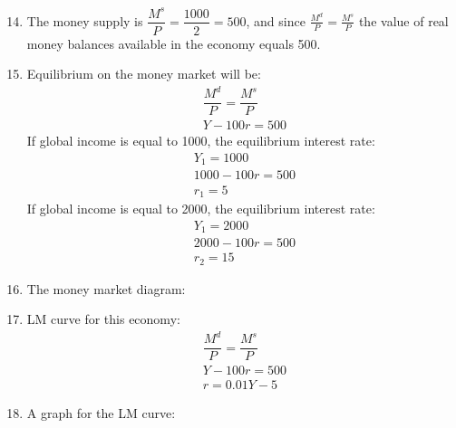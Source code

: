 \documentclass[a4paper,12pt]{article} %
\begin{document}
\begin{enumerate}
\begin{enumerate} [label=\arabic*)] 
	\setcounter{enumii}{13}


\item  The money supply is  $ \dfrac{M^{s}}{P} =  \dfrac{1000}{2} = 500 $, and since $ \frac{M^{d}}{P} = \frac{M^{s}}{P}  $ the value of real money balances available in the economy equals 500.

\item  Equilibrium on the money
market will be:
\begin{gather}
\dfrac{M^{d}}{P} = \dfrac{M^{s}}{P} \\  
Y - 100r = 500 
\end{gather}
If global income is equal to 1000, the equilibrium interest rate: 
\begin{gather}
Y_{1}=1000 \\  
1000 - 100r = 500 \\
r_{1}=5
\end{gather}
If global income is equal to 2000, the equilibrium interest rate: 
\begin{gather}
Y_{1}=2000 \\  
2000 - 100r = 500 \\
r_{2}=15
\end{gather}
\newpage
\item  The money market diagram:



\item LM curve for this economy:
\begin{gather}
\dfrac{M^{d}}{P} = \dfrac{M^{s}}{P} \\  
Y - 100r = 500\\
r=0.01Y-5 
\end{gather}
\item  A  graph for the LM curve: 


\end{enumerate}
\end{enumerate}
\end{document}
